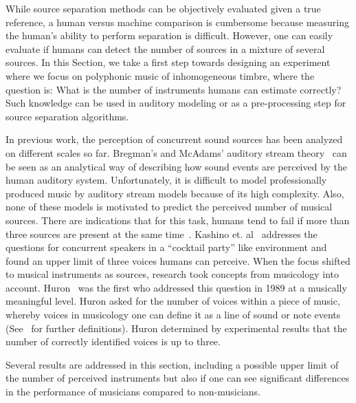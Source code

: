 While source separation methods can be objectively evaluated given a true reference, a human versus machine comparison is cumbersome because measuring the human's ability to perform separation is difficult. However, one can easily evaluate if humans can detect the number of sources in a mixture of several sources.
In this Section, we take a first step towards designing an experiment where we focus on polyphonic music of inhomogeneous timbre, where the question is: What is the number of instruments humans can estimate correctly?
Such knowledge can be used in auditory modeling or as a pre-processing step for source separation algorithms.
\par
In previous work, the perception of concurrent sound sources has been analyzed on different scales so far. 
Bregman's and McAdams' auditory stream theory~\cite{mcadams89} can be seen as an analytical way of describing how sound events are perceived by the human auditory system. 
Unfortunately, it is difficult to model professionally produced music by auditory stream models because of its high complexity.
Also, none of these models is motivated to predict the perceived number of musical sources. 
There are indications that for this task, humans tend to fail if more than three sources are present at the same time~\cite{huron89}.
Kashino et. al~\cite{kashino96} addresses the questions for concurrent speakers in a ``cocktail party'' like  environment and found an upper limit of three voices humans can perceive. 
When the focus shifted to musical instruments as sources, research took concepts from musicology into account. 
Huron~\cite{huron89} was the first who addressed this question in 1989 at a musically meaningful level.
Huron asked for the number of voices within a piece of music, whereby voices in musicology one can define it as a line of sound or note events (See~\cite{Cambouropoulos2008} for further definitions).
Huron determined by experimental results that the number of correctly identified voices is up to three.
\par
Several results are addressed in this section, including a possible upper limit of the number of perceived instruments but also if one can see significant differences in the performance of musicians compared to non-musicians.

